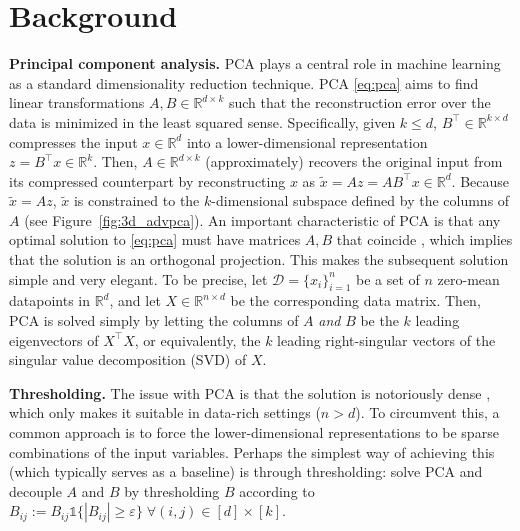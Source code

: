 \documentclass{article}
\newcommand{\R}{\mathbb{R}}
\newcommand{\abs}[1]{\left\lvert #1 \right\rvert}
\begin{document}
\section{Background}\label{sec:background}
\textbf{Principal component analysis.} PCA plays a central role in machine learning as a standard dimensionality reduction technique. PCA \eqref{eq:pca} aims to find linear transformations $A,B \in \R^{d \times k}$ such that the reconstruction error over the data is minimized in the least squared sense. Specifically, given $k \leq d$, $B^\top \in \R^{k \times d}$ compresses the input $x \in \R^d$ into a lower-dimensional representation $z = B^\top x \in \R^k$. Then, $A \in \R^{d \times k}$ (approximately) recovers the original input from its compressed counterpart by reconstructing $x$ as $\tilde{x} = Az = AB^\top x \in \R^d$. Because $\tilde{x} = Az$, $\tilde{x}$ is constrained to the $k$-dimensional subspace defined by the columns of $A$ (see Figure~\ref{fig:3d_advpca}). An important characteristic of PCA is that any optimal solution to \eqref{eq:pca} must have matrices $A,B$ that coincide \cite[ch.~23.1]{shalev-shwartz_understanding_2014}, which implies that the solution is an orthogonal projection. This makes the subsequent solution simple and very elegant. To be precise, let $\mathcal{D} =\{ x_i \}_{i=1}^n$ be a set of $n$ zero-mean datapoints in $\R^d$, and let $X \in \R^{n \times d}$ be the corresponding data matrix. Then, PCA is solved simply by letting the columns of $A$ \emph{and} $B$ be the $k$ leading eigenvectors of $X^\top X$, or equivalently, the $k$ leading right-singular vectors of the singular value decomposition (SVD) of $X$. 

\textbf{Thresholding.} The issue with PCA is that the solution is notoriously dense \cite{jolliffe_principal_2002}, which only makes it suitable in data-rich settings ($n>d$). To circumvent this, a common approach is to force the lower-dimensional representations to be sparse combinations of the input variables. Perhaps the simplest way of achieving this (which typically serves as a baseline) is through thresholding: solve PCA and decouple $A$ and $B$ by thresholding $B$ according to $B_{ij} := B_{ij} \mathds{1} \{ \abs{B_{ij}} \geq \varepsilon \} \; \forall (i,j) \in [d] \times [k]$.
\end{document}
